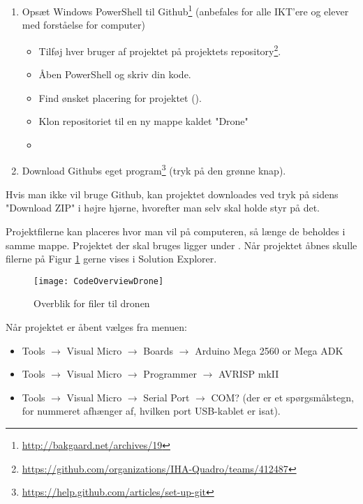 \documentclass[Main]{subfiles}
\begin{document}
\begin{enumerate}
\item Opsæt Windows PowerShell til Github\footnote{\url{http://bakgaard.net/archives/19}} (anbefales for alle IKT'ere og elever med forståelse for computer)
	\begin{itemize}
	\item Tilføj hver bruger af projektet på projektets repository\footnote{\url{https://github.com/organizations/IHA-Quadro/teams/412487}}.
	\item Åben PowerShell og skriv din kode.
	\item Find ønsket placering for projektet ().
	\item Klon repositoriet til en ny mappe kaldet "Drone" 
	\item[] 
	\end{itemize}
\item Download Githubs eget program\footnote{\url{https://help.github.com/articles/set-up-git}} (tryk på den grønne knap).
\end{enumerate}

Hvis man ikke vil bruge Github, kan projektet downloades ved tryk på sidens "Download ZIP" i højre hjørne, hvorefter man selv skal holde styr på det.

Projektfilerne kan placeres hvor man vil på computeren, så længe de beholdes i samme mappe.
Projektet der skal bruges ligger under .
Når projektet åbnes skulle filerne på Figur \ref{Fig:CodeOverviewDrone} gerne vises i Solution Explorer.

\begin{figure}[H]
\centering
\texttt{[image: CodeOverviewDrone]}
\caption{Overblik for filer til dronen}
\label{Fig:CodeOverviewDrone}
\end{figure}


Når projektet er åbent vælges fra menuen:
\begin{itemize}
\item Tools $\rightarrow$ Visual Micro $\rightarrow$ Boards $\rightarrow$ Arduino Mega 2560 or Mega ADK
\item Tools $\rightarrow$ Visual Micro $\rightarrow$ Programmer $\rightarrow$ AVRISP mkII
\item Tools $\rightarrow$ Visual Micro $\rightarrow$ Serial Port $\rightarrow$ COM? (der er et spørgsmålstegn, for nummeret afhænger af, hvilken port USB-kablet er isat).
\end{itemize}
\end{document}
